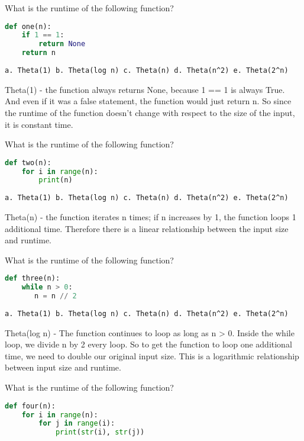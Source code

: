\question
What is the runtime of the following function?
\begin{lstlisting}[language=Python]
def one(n):
    if 1 == 1:
        return None
    return n
\end{lstlisting}

\begin{verbatim}
a. Theta(1) b. Theta(log n) c. Theta(n) d. Theta(n^2) e. Theta(2^n)
\end{verbatim}
\begin{solution}
Theta(1) - the function always returns None, because 1 == 1 is always True. And even if it was a false statement, the function would just return n. So since the runtime of the function doesn't change with respect to the size of the input, it is constant time.
\end{solution}

\question
What is the runtime of the following function?
\begin{lstlisting}[language=Python]
def two(n):
    for i in range(n):
        print(n)
\end{lstlisting}

\begin{verbatim}
a. Theta(1) b. Theta(log n) c. Theta(n) d. Theta(n^2) e. Theta(2^n)
\end{verbatim}
\begin{solution}
Theta(n) - the function iterates n times; if n increases by 1, the function loops 1 additional time. Therefore there is a linear relationship between the input size and runtime.
\end{solution}

\question
What is the runtime of the following function?
\begin{lstlisting}[language=Python]
def three(n):
    while n > 0:
       n = n // 2
\end{lstlisting}

\begin{verbatim}
a. Theta(1) b. Theta(log n) c. Theta(n) d. Theta(n^2) e. Theta(2^n)
\end{verbatim}
\begin{solution}
Theta(log n) - The function continues to loop as long as n > 0. Inside the while loop, we divide n by 2 every loop. So to get the function to loop one additional time, we need to double our original input size. This is a logarithmic relationship between input size and runtime.
\end{solution}

\question
What is the runtime of the following function?
\begin{lstlisting}[language=Python]
def four(n):
    for i in range(n):
        for j in range(i):
            print(str(i), str(j))
\end{lstlisting}

